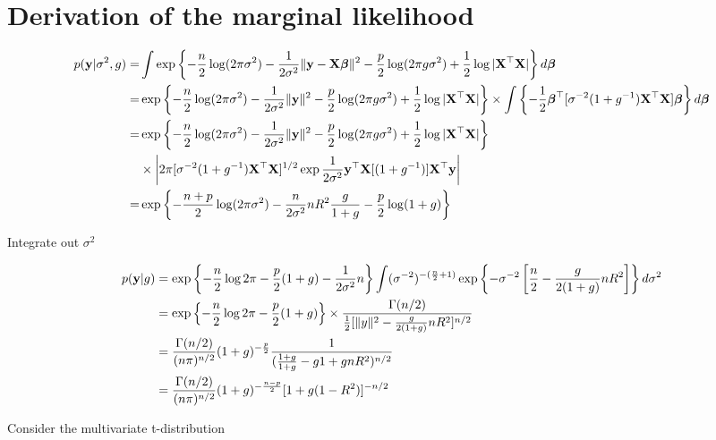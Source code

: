 \documentclass{amsart}[12pt]
\begin{document}
\section{Derivation of the marginal likelihood}
\begin{align*}
p({\bf y}|\sigma^2, g) =& \int \exp \left \{ -\frac{n}{2} \log(2 \pi \sigma^2)
                      - \frac{1}{2 \sigma^2} \|{\bf y} - {\bf X} {\boldsymbol \beta}\|^2
									    - \frac{p}{2} \log(2 \pi g \sigma^2) + \frac{1}{2} \log |{\bf X}^\top {\bf X}| \right \} d {\boldsymbol \beta} \\
=& \exp \left \{ -\frac{n}{2} \log(2 \pi \sigma^2)  - \frac{1}{2 \sigma^2} \|{\bf y}\|^2 - \frac{p}{2} \log(2 \pi g \sigma^2) + \frac{1}{2} \log |{\bf X}^\top {\bf X}| \right \}
    \times \int \left \{ -\frac{1}{2} {\boldsymbol \beta}^\top [\sigma^{-2} (1 + g^{-1}) {\bf X}^\top {\bf X}] {\boldsymbol\beta} \right \} d {\boldsymbol \beta} \\
=& \exp \left \{ -\frac{n}{2} \log(2 \pi \sigma^2)  - \frac{1}{2 \sigma^2} \|{\bf y}\|^2 - \frac{p}{2} \log(2 \pi g \sigma^2) + \frac{1}{2} \log |{\bf X}^\top {\bf X}| \right \} \\
    &\times \left |2 \pi [\sigma^{-2}(1 + g^{-1}) {\bf X}^\top {\bf X}]^{1/2}
    				\exp{\frac{1}{2 \sigma^2} {\bf y}^\top {\bf X}[(1 + g^{-1})] {\bf X}^\top {\bf y}} \right | \\
=& \exp \left \{ -\frac{n+p}{2} \log(2 \pi \sigma^2) - \frac{n}{2 \sigma^2} n R^2 \frac{g}{1 + g} - \frac{p}{2} \log(1 + g) \right \}
\end{align*}

Integrate out $\sigma^2$

\begin{align*}
p({\bf y} | g) &= \exp \left \{ -\frac{n}{2} \log 2 \pi - \frac{p}{2} (1 + g) - \frac{1}{2 \sigma^2} n  \right \} 
							\int (\sigma^{-2})^{-(\frac{n}{2} + 1)} \exp \left \{- \sigma^{-2} \left[ \frac{n}{2} - \frac{g}{2(1 + g)} n R^2 \right]\right \} d \sigma^2 \\
&= \exp \left \{ -\frac{n}{2} \log 2 \pi - \frac{p}{2} (1 + g) \right \}
	\times \frac{\Gamma(n/2)}{\frac{1}{2}[\|y\|^2 - \frac{g}{2(1 + g)} n R^2]^{n/2}} \\
&= \frac{\Gamma(n/2)}{(n \pi)^{n/2}} (1 + g)^{-\frac{p}{2}} \frac{1}{(\frac{1 + g}{1 + g} - {g}{1 + g} n R^2)^{n/2}} \\
&= \frac{\Gamma(n/2)}{(n \pi)^{n/2}} (1 + g)^{-\frac{n - p}{2}} [1 + g(1 - R^2)]^{-n/2} \\
\end{align*}

Consider the multivariate t-distribution
\end{document}
